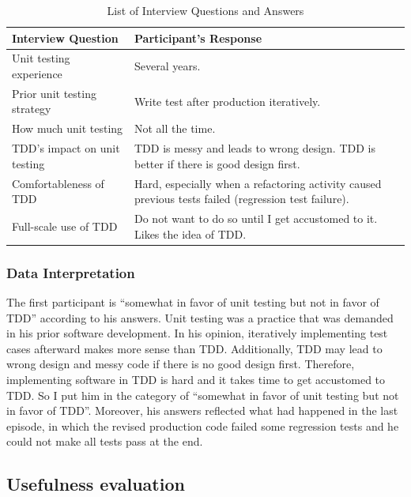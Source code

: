 \begin{table}[!h]
\centering
  \begin{tabular}{|l|p{8cm}|}
  \hline
    Interview Question & Participant's Response \\ \hline
    Unit testing experience         & Several years.\\ \hline
    Prior unit testing strategy     & Write test after production iteratively.\\ \hline
    How much unit testing           & Not all the time. \\ \hline
    TDD's impact on unit testing    & TDD is messy and leads to wrong design. 
                                      TDD is better if there is good design first. \\ \hline
    Comfortableness of TDD          & Hard, especially when a refactoring activity  
                                      caused previous tests failed (regression test failure). 
                                      \\ \hline
    Full-scale use of TDD           & Do not want to do so until I get accustomed 
                                      to it. Likes the idea of TDD.\\ \hline
  \end{tabular}
  \caption{List of Interview Questions and Answers}\label{tab:InterviewQuestionAndAnswer}  
\end{table}

\subsubsection{Data Interpretation}
 
The first participant is ``somewhat in favor of unit testing but not in 
favor of TDD'' according to his answers. Unit testing
was a practice that was demanded in his prior software development. In his
opinion, iteratively implementing test cases afterward makes more sense than 
TDD.  Additionally, TDD may lead to wrong design and messy code if there is no
good design first. Therefore, implementing software in TDD is hard and it 
takes time to get accustomed to TDD. So I put him in the category 
of ``somewhat in favor of unit testing but not in favor of TDD''.
Moreover, his answers reflected what had happened in the last episode, in 
which the revised production code failed some regression tests and he 
could not make all tests pass at the end. 

\subsection{Usefulness evaluation}

